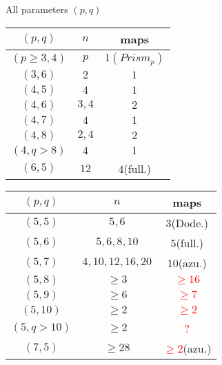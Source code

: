 \documentclass[%
pdf,
colorBG,
slideColor,
]{prosper}
\begin{document}
\begin{slide}{All parameters $(p,q)$}



\begin{minipage}{50mm}
\begin{center}
{\scriptsize
\begin{tabular}{||c|c|c||}
\hline
\hline
$(p,q)$       &$n$        &maps\\
\hline
$(p\geq 3,4)$ &$p$        &$1(Prism_p)$\\
$(3,6)$       &$2$        &$1$\\
\hline
$(4,5)$       &$4$        &$1$\\
$(4,6)$       &$3,4$      &$2$\\
$(4,7)$       &$4$        &$1$\\
$(4,8)$       &$2,4$      &$2$\\
$(4,q>8)$     &$4$        &$1$\\
\hline
$(6,5)$       &$12$       &$4$(full.)\\
\hline
\hline
\end{tabular}
}
\end{center}
\end{minipage}
\begin{minipage}{55mm}
\begin{center}
{\scriptsize
\begin{tabular}{||c|c|c||}
\hline
\hline
$(p,q)$       &$n$        &maps\\
\hline
$(5,5)$       &$5,6$      &$3$(Dode.)\\
$(5,6)$       &$5, 6, 8,10$           &$5$(full.)\\
$(5,7)$       &$4, 10, 12, 16, 20$  &$10$(azu.)\\
$(5,8)$       &$\geq 3$   &\textcolor{red}{$\geq 16$}\\
$(5,9)$       &$\geq 6$   &\textcolor{red}{$\geq 7$}\\
$(5,10)$      &$\geq 2$   &\textcolor{red}{$\geq 2$}\\
$(5,q> 10)$   &$\geq 2$   &\textcolor{red}{?}\\
\hline
$(7,5)$       &$\geq 28$  &\textcolor{red}{$\geq 2$}(azu.)\\
\hline
\hline
\end{tabular}
}
\end{center}
\end{minipage}


\end{slide}
\end{document}

